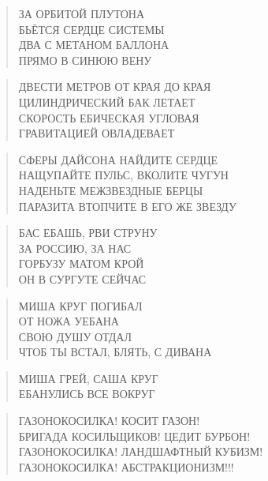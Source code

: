 \poemtitle{***}
\begin{verse}
ЗА ОРБИТОЙ ПЛУТОНА\\
БЬЁТСЯ СЕРДЦЕ СИСТЕМЫ\\
ДВА С МЕТАНОМ БАЛЛОНА\\
ПРЯМО В СИНЮЮ ВЕНУ
\end{verse}

\poemtitle{***}
\begin{verse}
ДВЕСТИ МЕТРОВ ОТ КРАЯ ДО КРАЯ\\
ЦИЛИНДРИЧЕСКИЙ БАК ЛЕТАЕТ\\
СКОРОСТЬ ЕБИЧЕСКАЯ УГЛОВАЯ\\
ГРАВИТАЦИЕЙ ОВЛАДЕВАЕТ
\end{verse}

\poemtitle{***}
\begin{verse}
СФЕРЫ ДАЙСОНА НАЙДИТЕ СЕРДЦЕ\\
НАЩУПАЙТЕ ПУЛЬС, ВКОЛИТЕ ЧУГУН\\
НАДЕНЬТЕ МЕЖЗВЕЗДНЫЕ БЕРЦЫ\\
ПАРАЗИТА ВТОПЧИТЕ В ЕГО ЖЕ ЗВЕЗДУ
\end{verse}

\poemtitle{***}
\begin{verse}
БАС ЕБАШЬ, РВИ СТРУНУ\\
ЗА РОССИЮ, ЗА НАС\\
ГОРБУЗУ МАТОМ КРОЙ\\
ОН В СУРГУТЕ СЕЙЧАС
\end{verse}

\poemtitle{***}
\begin{verse}
МИША КРУГ ПОГИБАЛ\\
ОТ НОЖА УЕБАНА\\
СВОЮ ДУШУ ОТДАЛ\\
ЧТОБ ТЫ ВСТАЛ, БЛЯТЬ, С ДИВАНА
\end{verse}

\poemtitle{***}
\begin{verse}
МИША ГРЕЙ, САША КРУГ\\
ЕБАНУЛИСЬ ВСЕ ВОКРУГ
\end{verse}

\poemtitle{***}
\begin{verse}
ГАЗОНОКОСИЛКА! КОСИТ ГАЗОН!\\
БРИГАДА КОСИЛЬЩИКОВ! ЦЕДИТ БУРБОН!\\
ГАЗОНОКОСИЛКА! ЛАНДШАФТНЫЙ КУБИЗМ!\\
ГАЗОНОКОСИЛКА! АБСТРАКЦИОНИЗМ!!!
\end{verse}

